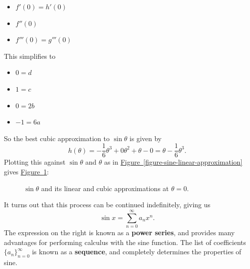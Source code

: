 \documentclass[10pt,]{book}
\newcommand{\terminology}[1]{\textbf{#1}}
\numberwithin{equation}{section}
\begin{document}
\begin{introduction}{}
\begin{itemize}[label=\textbullet]
\item{}\(f'(0) = h'(0)\)%
\item{}\(f''(0)\)%
\item{}\(f'''(0) = g'''(0)\)%
\end{itemize}
\hypertarget{p-783}{}%
This simplifies to%
\leavevmode%
\begin{itemize}[label=\textbullet]
\item{}\(0 = d\)%
\item{}\(1 = c\)%
\item{}\(0 = 2b\)%
\item{}\(-1 = 6a\)%
\end{itemize}
\hypertarget{p-784}{}%
So the best cubic approximation to \(\sin\theta\) is given by%
\begin{equation*}
h(\theta) = -\frac{1}{6}\theta^{3} + 0\theta^{2} + \theta - 0 = \theta  -\frac{1}{6}\theta^{3}.
\end{equation*}
Plotting this against \(\sin \theta\) and \(\theta\) as in \hyperref[figure-sine-linear-approximation]{Figure~\ref{figure-sine-linear-approximation}} gives \hyperref[figure-sine-cubic-approximation]{Figure~\ref{figure-sine-cubic-approximation}}:%
\begin{figure}
\centering
{
}
\caption{\(\sin\theta\) and its linear and cubic approximations at \(\theta=0\).\label{figure-sine-cubic-approximation}}
\end{figure}
\hypertarget{p-785}{}%
It turns out that this process can be continued indefinitely, giving us%
\begin{equation*}
\sin x = \sum_{n=0}^{\infty}a_{n}x^{n}.
\end{equation*}
The expression on the right is known as a \terminology{power series}, and provides many advantages for performing calculus with the sine function. The list of coefficients \(\{a_{n}\}_{n=0}^{\infty}\) is known as a \terminology{sequence}, and completely determines the properties of sine.%
\end{introduction}%
%
%
\typeout{************************************************}
\typeout{************************************************}
%
\end{document}
